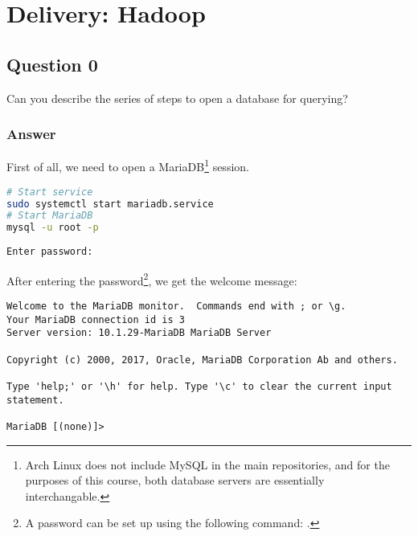 \setcounter{section}{2}
\setcounter{page}{1}
\section{Delivery: Hadoop} %

\subsection*{Question 0}
Can you describe the series of steps to open a database for querying?

\subsubsection*{Answer}
First of all, we need to open a MariaDB\footnote{Arch Linux does not include MySQL in the main repositories, and for the purposes of this course, both database servers are essentially interchangable.} session.

\begin{lstlisting}[language=bash]
# Start service
sudo systemctl start mariadb.service
# Start MariaDB
mysql -u root -p
\end{lstlisting}

\begin{lstlisting}[style=output]
Enter password:
\end{lstlisting}

After entering the password\footnote{A password can be set up using the following command: .}, we get the welcome message:

\begin{lstlisting}[style=output]
Welcome to the MariaDB monitor.  Commands end with ; or \g.
Your MariaDB connection id is 3
Server version: 10.1.29-MariaDB MariaDB Server

Copyright (c) 2000, 2017, Oracle, MariaDB Corporation Ab and others.

Type 'help;' or '\h' for help. Type '\c' to clear the current input statement.

MariaDB [(none)]>
\end{lstlisting}

